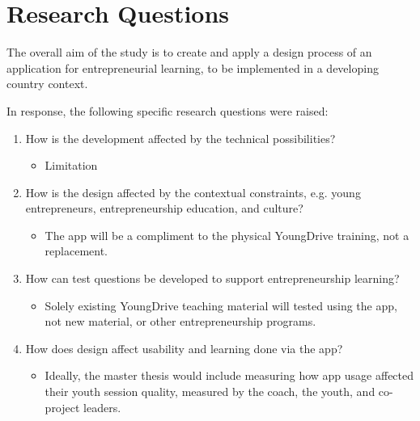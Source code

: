 \section{Research Questions}

The overall aim of the study is to create and apply a design process of an application for entrepreneurial learning, to be implemented in a developing country context.

In response, the following specific research questions were raised:

\begin{enumerate}
    \item How is the development affected by the technical possibilities?
    \begin{itemize}
    \item Limitation 
    \end{itemize}

    \item How is the design affected by the contextual  constraints, e.g. young entrepreneurs, entrepreneurship education, and culture? %
    \begin{itemize}
        \item The app will be a compliment to the physical YoungDrive training, not a replacement.
    \end{itemize}


    \item How can test questions be developed to support entrepreneurship learning? %
    \begin{itemize}
        \item Solely existing YoungDrive teaching material will tested using the app, not new material, or other entrepreneurship programs.
    \end{itemize}

    \item How does design affect usability and learning done via the app? %
    \begin{itemize}
        \item Ideally, the master thesis would include measuring how app usage affected their youth session quality, measured by the coach, the youth, and co-project leaders.


\end{itemize}
\end{enumerate}
